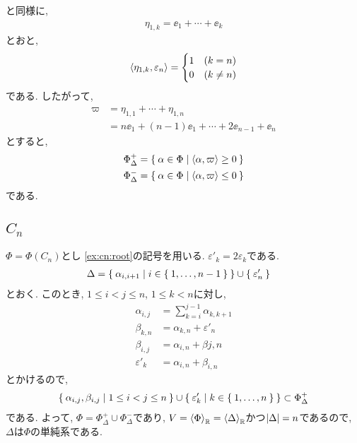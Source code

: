 と同様に,
\begin{align*}
  \eta_{1,k}=\ee_1+\cdots+\ee_k
\end{align*}
とおと,
\begin{align*}
  \Braket{\eta_{1,k},\varepsilon_{n}}=
  \begin{cases}
    1 &(k=n)\\
    0 &(k\neq n)
  \end{cases}
\end{align*}
である.
したがって,
\begin{align*}
  \varpi&=\eta_{1,1}+\cdots+\eta_{1,n}\\
  &=n\ee_1+(n-1)\ee_1+\cdots+2\ee_{n-1}+\ee_{n}
\end{align*}
  とすると,
\begin{align*}
\Phi_\Delta^+&=\Set{\alpha\in\Phi|\Braket{\alpha,\varpi}\geq 0}\\
\Phi_\Delta^-&=\Set{\alpha\in\Phi|\Braket{\alpha,\varpi}\leq 0}
\end{align*}
である.


\subsection{$C_{n}$}
\label{ex:cn:simple}
$\Phi=\Phi(C_n)$とし
\cref{ex:cn:root}の記号を用いる.
$\varepsilon'_k=2\varepsilon_k$である.
\begin{align*}
  \Delta&=\Set{\alpha_{i,i+1}|i\in\Set{1,\ldots,n-1}}\cup \Set{\varepsilon'_n}
\end{align*}
とおく.
このとき, $1\leq i<j\leq n$, $1\leq k <n$に対し,
\begin{align*}
\alpha_{i,j}&=\sum_{k=i}^{j-1}\alpha_{k,k+1}\\
\beta_{k,n}&=\alpha_{k,n}+\varepsilon'_{n}\\
\beta_{i,j}&=\alpha_{i,n}+\beta{j,n}\\
\varepsilon'_{k}&=\alpha_{i,n}+\beta_{i,n}
\end{align*}
とかけるので,
\begin{align*}
  \Set{\alpha_{i,j},\beta_{i,j}|1\leq i<j\leq n}\cup \Set{\varepsilon'_k | k\in\Set{1,\ldots,n}}\subset\Phi_\Delta^+
\end{align*}
である. よって, $\Phi=\Phi_\Delta^+\cup \Phi_\Delta^-$であり, $V=\Braket{\Phi}_{\mathbb{R}}=\Braket{\Delta}_{\mathbb{R}}$かつ$\left|\Delta\right|=n$であるので,
$\Delta$は$\Phi$の単純系である.


